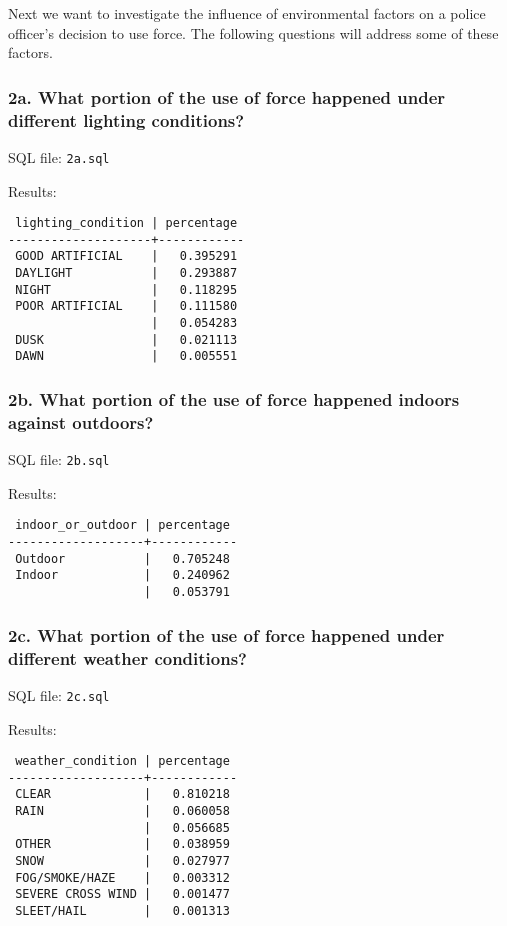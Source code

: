 \documentclass[10pt]{article}
\begin{document}
Next we want to investigate the influence of environmental factors on a police officer's decision to use force. The following questions will address some of these factors.

\subsubsection*{2a. What portion of the use of force happened under different lighting conditions?}

SQL file: \texttt{2a.sql}

Results:

\begin{verbatim}
 lighting_condition | percentage
--------------------+------------
 GOOD ARTIFICIAL    |   0.395291
 DAYLIGHT           |   0.293887
 NIGHT              |   0.118295
 POOR ARTIFICIAL    |   0.111580
                    |   0.054283
 DUSK               |   0.021113
 DAWN               |   0.005551
\end{verbatim}

\subsubsection*{2b. What portion of the use of force happened indoors against outdoors?}

SQL file: \texttt{2b.sql}

Results:

\begin{verbatim}
 indoor_or_outdoor | percentage
-------------------+------------
 Outdoor           |   0.705248
 Indoor            |   0.240962
                   |   0.053791
\end{verbatim}

\subsubsection*{2c. What portion of the use of force happened under different weather conditions?}

SQL file: \texttt{2c.sql}

Results:

\begin{verbatim}
 weather_condition | percentage
-------------------+------------
 CLEAR             |   0.810218
 RAIN              |   0.060058
                   |   0.056685
 OTHER             |   0.038959
 SNOW              |   0.027977
 FOG/SMOKE/HAZE    |   0.003312
 SEVERE CROSS WIND |   0.001477
 SLEET/HAIL        |   0.001313
\end{verbatim}
\end{document}
